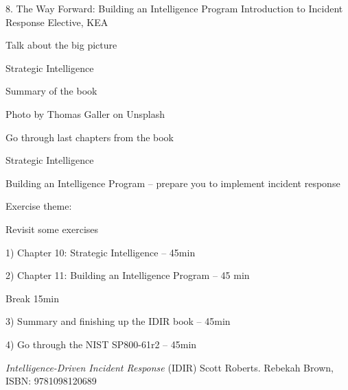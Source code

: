 \documentclass[Screen16to9,17pt]{foils}
\begin{document}
\mytitlepage
{8. The Way Forward: Building an Intelligence Program}
{Introduction to Incident Response Elective, KEA}




\begin{list2}
\item Talk about the big picture
\item Strategic Intelligence
\item Summary of the book
\end{list2}

{\hfill \small Photo by Thomas Galler on Unsplash}


\begin{list2}
\item Go through last chapters from the book
\item Strategic Intelligence
\item Building an Intelligence Program -- prepare you to implement incident response
\end{list2}

Exercise theme:
\begin{list2}
\item Revisit some exercises
\end{list2}



\begin{list2}
\item 1) Chapter 10: Strategic Intelligence -- 45min
\item 2) Chapter 11: Building an Intelligence Program -- 45 min
\item Break 15min
\item 3) Summary and finishing up the IDIR book -- 45min
\item 4) Go through the NIST SP800-61r2 -- 45min
\end{list2}



\emph{Intelligence-Driven Incident Response} (IDIR)
 Scott Roberts. Rebekah Brown, ISBN: 9781098120689

\begin{quote}

\end{quote}
\end{document}
